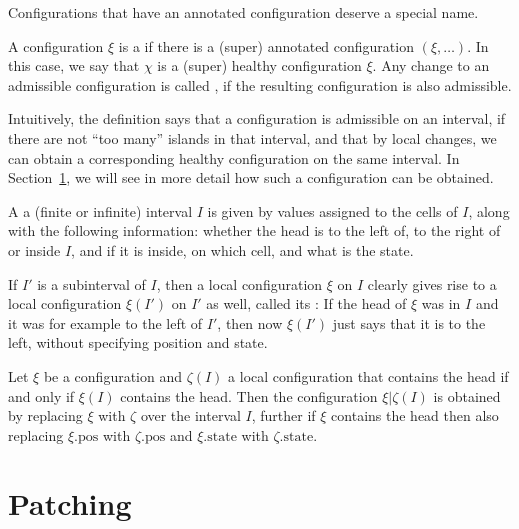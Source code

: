 \documentclass[12pt]{memoir}
\newcommand{\pos}{\mathrm{pos}}
\newcommand{\state}{\mathrm{state}}
\begin{document}
Configurations that have an annotated configuration deserve
a special name.

\begin{definition}
\label{def:admissible-config}
    A configuration \( \xi \) is a  if there is a (super)
    annotated configuration  \( (\xi,\dots) \).
    In this case, we say that \( \chi \) is a (super) healthy
    configuration  \( \xi \).
    Any change to an admissible configuration is called 
    , if the resulting configuration is also admissible.
\end{definition}

Intuitively, the definition says that a configuration is
admissible on an interval, if there are not ``too many'' islands
in that interval, and that by local changes, we can obtain
a corresponding healthy configuration on the same interval.
In Section~\ref{sec:patching}, we will see in more detail how
such a configuration can be obtained.

\begin{definition}
\label{def:local-config}
  A  a (finite or infinite)
  interval \( I \) is given by values assigned to the cells
  of \( I \), along with the following information: whether
  the head is to the left of, to the right of or inside
  \( I \), and if it is inside, on which cell, and what is
  the state.

  If \( I' \) is a subinterval of \( I \), then a local configuration
  \( \xi \) on \( I \) clearly gives rise to a local configuration
  \( \xi(I') \) on \( I' \) as well, called its
  : If the head of \( \xi \) was in \( I \)
  and it was for example to the left of \( I' \), then now
  \( \xi(I') \) just says that it is to the left, without
  specifying position and state.

  Let \( \xi \) be a configuration and \( \zeta(I) \) a local
  configuration that contains the head if and only if
  \( \xi(I) \) contains the head.
  Then the configuration \( \xi|\zeta(I) \) is obtained by
  replacing \( \xi \) with \( \zeta \) over the interval \( I \),
  further if \( \xi \) contains the head then also replacing
  \( \xi.\pos \) with \( \zeta.\pos \) and \( \xi.\state \) with
  \( \zeta.\state \).
\end{definition}


\section{Patching}\label{sec:patching}
\end{document}

